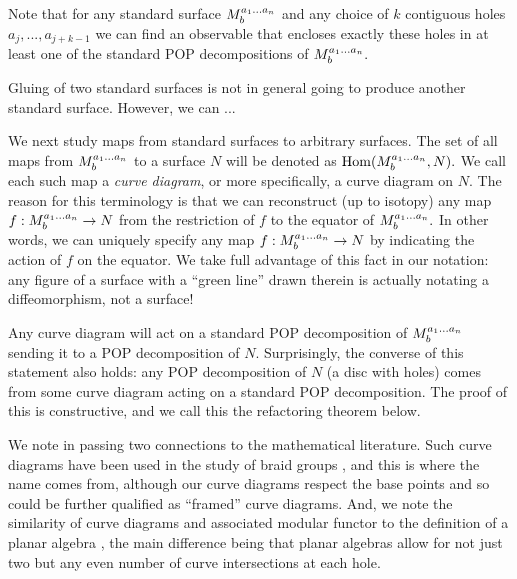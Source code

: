 \documentclass[aps, prl, letterpaper, twocolumn, superscriptaddress, notitlepage, 10pt]{revtex4-1}
\begin{document}
Note that for any standard surface $M^{a_1...a_n}_{b}$ 
and any choice of $k$ contiguous holes $a_j,...,a_{j+k-1}$
we can find an observable that encloses exactly these holes
in at least one of the standard POP decompositions of $M^{a_1...a_n}_{b}.$ 

Gluing of two standard surfaces is not in general going to
produce another standard surface. However, we can ... 

We next study maps from standard surfaces to arbitrary surfaces.
The set of all maps from $M^{a_1...a_n}_{b}$ 
to a surface $N$ will be denoted as ${\mathrm{Hom}}(M^{a_1...a_n}_{b}, N).$ 
We call each such map a \emph{curve diagram},
or more specifically, a curve diagram on $N$.
The reason for this terminology is that we can reconstruct (up to isotopy)
any map $f:M^{a_1...a_n}_{b}\to N$ from
the restriction of $f$ to the equator of $M^{a_1...a_n}_{b}.$ 
In other words, we can uniquely specify any map
$f:M^{a_1...a_n}_{b}\to N$ by indicating the action of
$f$ on the equator. We take full advantage of this
fact in our notation: any figure of a surface
with a ``green line'' drawn therein is actually notating a 
diffeomorphism, not a surface!

Any curve diagram will act on a standard POP decomposition
of $M^{a_1...a_n}_{b}$ sending it to a POP decomposition of $N.$
Surprisingly, the converse of this statement also holds:
any POP decomposition of $N$ (a disc with holes)
comes from some curve diagram
acting on a standard POP decomposition.
The proof of this is constructive, and we call this
the refactoring theorem below.



We note in passing two connections to the mathematical literature.
Such curve diagrams have been 
used in the study of braid groups \cite{Dehornoy2002}, and this
is where the name comes from, although our
curve diagrams respect the base points and so could be further
qualified as ``framed'' curve diagrams.
And, we note the similarity of curve diagrams and associated
modular functor 
to the definition of a planar algebra \cite{Jones1999},
the main difference being that planar algebras allow for 
not just two but any even number of curve intersections at each hole.
\end{document}
